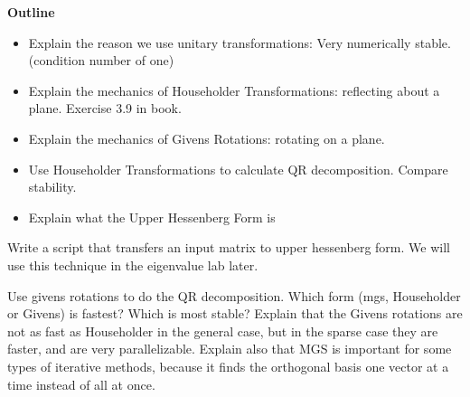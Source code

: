 

{\bf Outline}
\begin{itemize}
\item Explain the reason we use unitary transformations: Very numerically stable. (condition number of one)
\item Explain the mechanics of Householder Transformations: reflecting about a plane. Exercise 3.9 in book.
\item Explain the mechanics of Givens Rotations: rotating on a plane.
\item Use Householder Transformations to calculate QR decomposition. Compare stability.
\item Explain what the Upper Hessenberg Form is
\end{itemize}

\begin{problem}
Write a script that transfers an input matrix to upper hessenberg form. We will use this technique in the eigenvalue lab later.
\end{problem}

\begin{problem}
Use givens rotations to do the QR decomposition. Which form (mgs, Householder or Givens) is fastest? Which is most stable? Explain that the Givens rotations are not as fast as Householder in the general case, but in the sparse case they are faster, and are very parallelizable. Explain also that MGS is important for some types of iterative methods, because it finds the orthogonal basis one vector at a time instead of all at once.
\end{problem}

